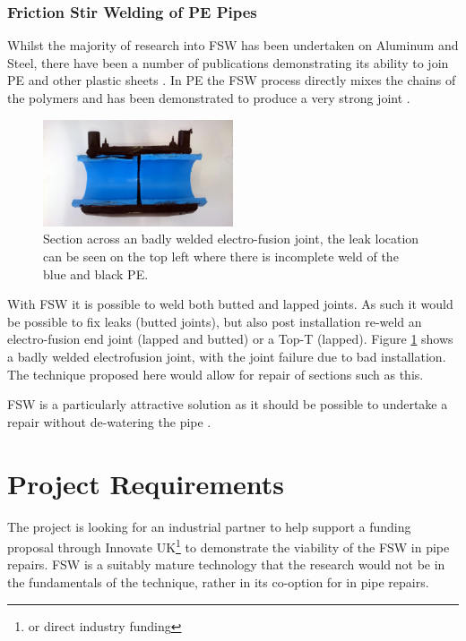\documentclass[	DIV=calc,%
							paper=a4,%
							fontsize=11pt,%
							twocolumn]{scrartcl}	 					%
\begin{document}
\subsubsection*{Friction Stir Welding of PE Pipes}
Whilst the majority of research into FSW has been undertaken on Aluminum and 
Steel, there have been a number of publications demonstrating its ability to 
join PE and other plastic sheets \cite{squeo2009friction,gao2014submerged}.  
In PE the FSW process directly mixes the chains of the polymers and has been 
demonstrated to produce a very strong joint \cite{zafar2017friction}.

\begin{figure}[htp]
 \centering
 \includegraphics[width = 0.5\textwidth]{ElectroFusion}
 \caption{Section across an badly welded electro-fusion joint, the leak 
location can be seen on the top left where there is incomplete weld of the blue 
and black PE.}
\label{ElectroFusion}
\end{figure}

With FSW it is possible to weld both butted and lapped joints. As such it would 
be possible to fix leaks (butted joints), but also post installation re-weld an 
electro-fusion end joint (lapped and butted) or a Top-T (lapped). 
Figure \ref{ElectroFusion} shows a badly welded electrofusion joint, with the 
joint failure due to bad installation. The technique proposed here would allow 
for repair of sections such as this.

FSW is a particularly attractive solution as it should be possible to undertake 
a repair without de-watering the pipe \cite{gao2014submerged}.



\section*{Project Requirements}
The project is looking for an industrial partner to help support a funding 
proposal through Innovate UK\footnote{or direct industry funding} to 
demonstrate the viability of the FSW in pipe repairs.  FSW is a suitably mature 
technology that the research would not be in the fundamentals of the technique, 
rather in its co-option for in pipe repairs.
\end{document}
